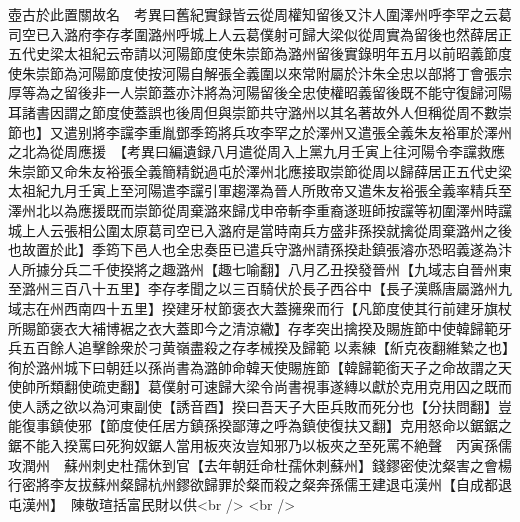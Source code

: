 壺古於此置關故名　考異曰舊紀實録皆云從周權知留後又汴人圍澤州呼李罕之云葛司空已入潞府李存孝圍潞州呼城上人云葛僕射可歸大梁似從周實為留後也然薛居正五代史梁太祖紀云帝請以河陽節度使朱崇節為潞州留後實錄明年五月以前昭義節度使朱崇節為河陽節度使按河陽自解張全義圍以來常附屬於汴朱全忠以部將丁會張宗厚等為之留後非一人崇節蓋亦汴將為河陽留後全忠使權昭義留後既不能守復歸河陽耳諸書因謂之節度使蓋誤也後周但與崇節共守潞州以其名著故外人但稱從周不數崇節也】又遣别將李讜李重胤鄧季筠將兵攻李罕之於澤州又遣張全義朱友裕軍於澤州之北為從周應援　【考異曰編遺録八月遣從周入上黨九月壬寅上往河陽令李讜救應朱崇節又命朱友裕張全義簡精鋭過屯於澤州北應接取崇節從周以歸薛居正五代史梁太祖紀九月壬寅上至河陽遣李讜引軍趨澤為晉人所敗帝又遣朱友裕張全義率精兵至澤州北以為應援既而崇節從周棄潞來歸戊申帝斬李重裔遂班師按讜等初圍澤州時讜城上人云張相公圍太原葛司空已入潞府是當時南兵方盛非孫揆就擒從周棄潞州之後也故置於此】季筠下邑人也全忠奏臣已遣兵守潞州請孫揆赴鎮張濬亦恐昭義遂為汴人所據分兵二千使揆將之趣潞州【趣七喻翻】八月乙丑揆發晉州【九域志自晉州東至潞州三百八十五里】李存孝聞之以三百騎伏於長子西谷中【長子漢縣唐屬潞州九域志在州西南四十五里】揆建牙杖節褒衣大蓋擁衆而行【凡節度使其行前建牙旗杖所賜節褒衣大補博裾之衣大蓋即今之清涼繖】存孝突出擒揆及賜旌節中使韓歸範牙兵五百餘人追擊餘衆於刁黄嶺盡殺之存孝械揆及歸範以素練【紤克夜翻維縶之也】徇於潞州城下曰朝廷以孫尚書為潞帥命韓天使賜旌節【韓歸範銜天子之命故謂之天使帥所類翻使疏吏翻】葛僕射可速歸大梁令尚書視事遂縳以獻於克用克用囚之既而使人誘之欲以為河東副使【誘音酉】揆曰吾天子大臣兵敗而死分也【分扶問翻】豈能復事鎮使邪【節度使任居方鎮孫揆鄙薄之呼為鎮使復扶又翻】克用怒命以鋸鋸之鋸不能入揆罵曰死狗奴鋸人當用板夾汝豈知邪乃以板夾之至死罵不絶聲　丙寅孫儒攻潤州　蘇州刺史杜孺休到官【去年朝廷命杜孺休刺蘇州】錢鏐密使沈粲害之會楊行密將李友拔蘇州粲歸杭州鏐欲歸罪於粲而殺之粲奔孫儒王建退屯漢州【自成都退屯漢州】　陳敬瑄括富民財以供<br />
<br />

